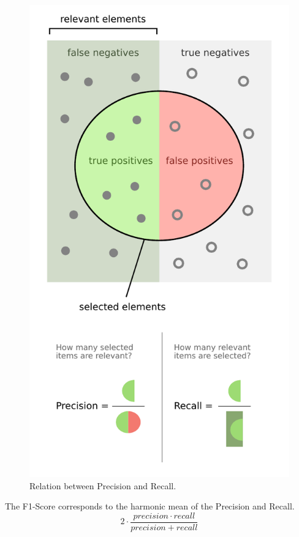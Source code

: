 \begin{figure}[htb]
    \centering
    \includegraphics[height=0.5\textheight]{figures/chap-4/precision-recall.pdf}
    \caption{Relation between Precision and Recall.}
    \label{processing:precision-recall}
\end{figure}

The F1-Score corresponds to the harmonic mean of the Precision and Recall.
\[2\cdot \frac{precision\cdot recall}{precision + recall}\]

